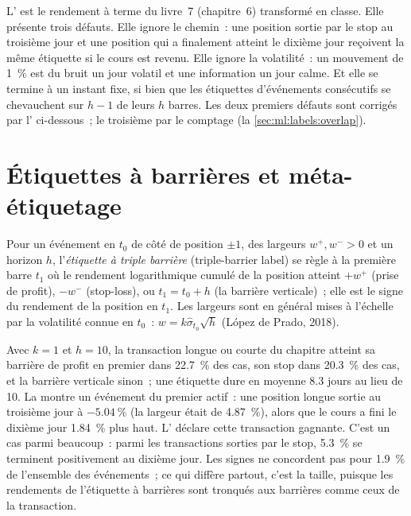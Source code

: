 L' est le rendement à terme du livre~7 (chapitre~6) transformé en classe. Elle présente trois défauts. Elle ignore le chemin~: une position
sortie par le stop au troisième jour et une position qui a finalement atteint le dixième jour reçoivent la même étiquette si le cours est revenu. Elle ignore la volatilité~: un mouvement de 1~\% est du bruit un jour volatil et une information
un jour calme. Et elle se termine à un instant fixe, si bien que les étiquettes d'événements consécutifs se chevauchent sur $h - 1$ de leurs $h$ barres. Les deux premiers défauts
sont corrigés par l' ci-dessous~; le troisième
par le comptage (la \cref{sec:ml:labels:overlap}).

\section{Étiquettes à barrières et méta-étiquetage}

\begin{definition}\label{def:ml:targets-labels-and-sample-weights:triple}
Pour un événement en $t_0$ de côté de position $\pm1$, des largeurs $w^+, w^- > 0$ et un horizon $h$, l'\emph{étiquette à triple
barrière} (triple-barrier label) se règle à la première barre $t_1$ où le rendement logarithmique cumulé de la position atteint
$+w^+$ (prise de profit), $-w^-$ (stop-loss), ou $t_1 = t_0 + h$ (la barrière verticale)~; elle est le signe du rendement de la position
en $t_1$. Les largeurs sont en général mises à l'échelle par la volatilité connue en $t_0$~: $w = k\hat\sigma_{t_0}\sqrt h$
(López de Prado, 2018).
\end{definition}

Avec $k = 1$ et $h = 10$, la transaction longue ou courte du chapitre atteint sa barrière de profit en premier dans 22.7~\% des cas,
son stop dans 20.3~\% des cas, et la barrière verticale sinon~; une étiquette dure en moyenne 8.3 jours au lieu de 10.
La  montre un événement du premier actif~: une position longue sortie au troisième jour à $-5.04~\%$ (la
largeur était de 4.87~\%), alors que le cours a fini le dixième jour 1.84~\% plus haut. L' déclare cette transaction gagnante.
C'est un cas parmi beaucoup~: parmi les transactions sorties par le stop, 5.3~\% se terminent positivement au dixième jour. Les signes ne concordent pas pour 1.9~\% de l'ensemble des événements~;
ce qui diffère partout, c'est la taille, puisque les rendements de l'étiquette à barrières sont tronqués aux barrières
comme ceux de la transaction.

